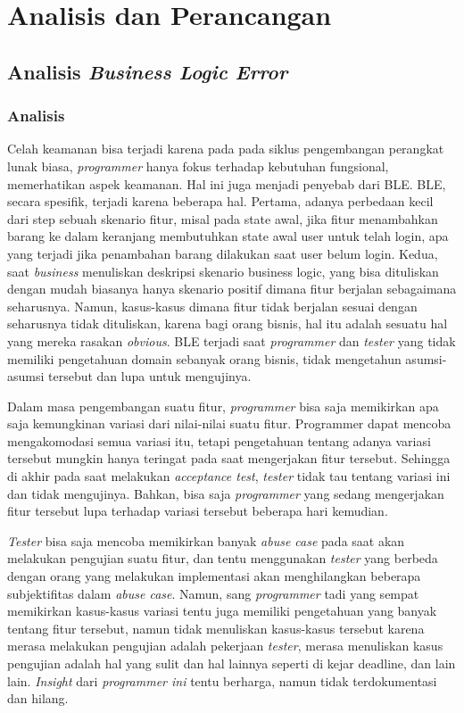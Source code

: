 \chapter{Analisis dan Perancangan}

\section{Analisis \emph{Business Logic Error}}

\subsection{Analisis}

Celah keamanan bisa terjadi karena pada pada siklus pengembangan perangkat lunak
biasa, \emph{programmer} hanya fokus terhadap kebutuhan fungsional,
memerhatikan aspek keamanan. Hal ini juga menjadi penyebab dari BLE.
BLE, secara spesifik, terjadi karena beberapa hal.
Pertama, adanya perbedaan kecil dari step sebuah skenario fitur, misal pada state awal,
jika fitur
menambahkan barang ke dalam keranjang membutuhkan state awal user untuk telah login,
apa yang terjadi jika penambahan barang dilakukan saat user belum login.
Kedua, saat \emph{business} menuliskan deskripsi skenario business logic,
yang bisa dituliskan dengan mudah biasanya hanya skenario positif dimana
fitur berjalan sebagaimana seharusnya. Namun, kasus-kasus dimana fitur
tidak berjalan sesuai dengan seharusnya tidak dituliskan, karena bagi orang bisnis,
hal itu adalah sesuatu hal yang mereka rasakan \emph{obvious}.
BLE terjadi saat \emph{programmer} dan \emph{tester} yang tidak memiliki
pengetahuan domain sebanyak orang bisnis, tidak mengetahun asumsi-asumsi tersebut dan lupa
untuk mengujinya.

Dalam masa pengembangan suatu fitur, \emph{programmer} bisa saja memikirkan
apa saja kemungkinan variasi dari nilai-nilai suatu fitur. Programmer
dapat mencoba mengakomodasi semua variasi itu, tetapi pengetahuan tentang
adanya variasi tersebut mungkin hanya teringat pada saat mengerjakan
fitur tersebut. Sehingga di akhir pada saat melakukan \emph{acceptance test},
\emph{tester} tidak tau tentang variasi ini dan tidak mengujinya.
Bahkan, bisa saja \emph{programmer} yang sedang mengerjakan fitur tersebut
lupa terhadap variasi tersebut beberapa hari kemudian.

\emph{Tester} bisa saja mencoba memikirkan banyak \emph{abuse case} pada saat
akan melakukan pengujian suatu fitur, dan tentu menggunakan \emph{tester} yang
berbeda dengan orang yang melakukan implementasi akan menghilangkan beberapa
subjektifitas dalam \emph{abuse case}. Namun, sang \emph{programmer} tadi yang
sempat memikirkan kasus-kasus variasi tentu juga memiliki pengetahuan yang banyak
tentang fitur tersebut, namun tidak menuliskan kasus-kasus tersebut karena merasa
melakukan pengujian adalah pekerjaan \emph{tester}, merasa menuliskan kasus pengujian
adalah hal yang sulit dan hal lainnya seperti di kejar
deadline, dan lain lain. \emph{Insight} dari \emph{programmer ini} tentu berharga,
namun tidak terdokumentasi dan hilang.

